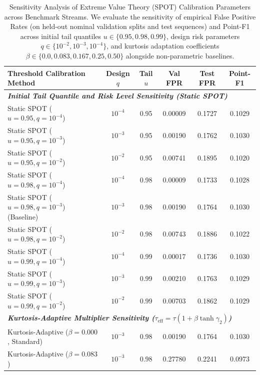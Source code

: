 \begin{table}[t]
\centering
\small
\caption{Sensitivity Analysis of Extreme Value Theory (SPOT) Calibration Parameters across Benchmark Streams. We evaluate the sensitivity of empirical False Positive Rates (on held-out nominal validation splits and test sequences) and Point-F1 across initial tail quantiles $u \in \{0.95, 0.98, 0.99\}$, design risk parameters $q \in \{10^{-2}, 10^{-3}, 10^{-4}\}$, and kurtosis adaptation coefficients $\beta \in \{0.0, 0.083, 0.167, 0.25, 0.50\}$ alongside non-parametric baselines.}
\label{tab:evt_sensitivity}
\scriptsize
\setlength{\tabcolsep}{2.5pt}
\begin{tabular}{@{}l cccc c@{}}
\toprule
\textbf{Threshold Calibration Method} & \textbf{Design $q$} & \textbf{Tail $u$} & \textbf{Val FPR} & \textbf{Test FPR} & \textbf{Point-F1} \\
\midrule
\multicolumn{6}{l}{\textit{\textbf{Initial Tail Quantile and Risk Level Sensitivity (Static SPOT)}}} \\
Static SPOT ($u=0.95, q=10^{-4}$)      & $10^{-4}$ & 0.95 & 0.00009 & 0.1727 & 0.1029 \\
Static SPOT ($u=0.95, q=10^{-3}$)      & $10^{-3}$ & 0.95 & 0.00190 & 0.1762 & 0.1030 \\
Static SPOT ($u=0.95, q=10^{-2}$)      & $10^{-2}$ & 0.95 & 0.00741 & 0.1895 & 0.1020 \\
\addlinespace[2pt]
Static SPOT ($u=0.98, q=10^{-4}$)      & $10^{-4}$ & 0.98 & 0.00009 & 0.1733 & 0.1028 \\
Static SPOT ($u=0.98, q=10^{-3}$) (Baseline)& $10^{-3}$ & 0.98 & 0.00190 & 0.1764 & 0.1030 \\
Static SPOT ($u=0.98, q=10^{-2}$)      & $10^{-2}$ & 0.98 & 0.00743 & 0.1886 & 0.1022 \\
\addlinespace[2pt]
Static SPOT ($u=0.99, q=10^{-4}$)      & $10^{-4}$ & 0.99 & 0.00017 & 0.1736 & 0.1030 \\
Static SPOT ($u=0.99, q=10^{-3}$)      & $10^{-3}$ & 0.99 & 0.00210 & 0.1763 & 0.1029 \\
Static SPOT ($u=0.99, q=10^{-2}$)      & $10^{-2}$ & 0.99 & 0.00703 & 0.1862 & 0.1029 \\
\midrule
\multicolumn{6}{l}{\textit{\textbf{Kurtosis-Adaptive Multiplier Sensitivity ($\tau_{\text{eff}} = \tau(1 + \beta\tanh\gamma_2)$)}}} \\
Kurtosis-Adaptive ($\beta=0.000$, Standard) & $10^{-3}$ & 0.98 & 0.00190 & 0.1764 & 0.1030 \\
Kurtosis-Adaptive ($\beta=0.083$)           & $10^{-3}$ & 0.98 & 0.27780 & 0.2241 & 0.0973 \\

\end{tabular}
\end{table}

